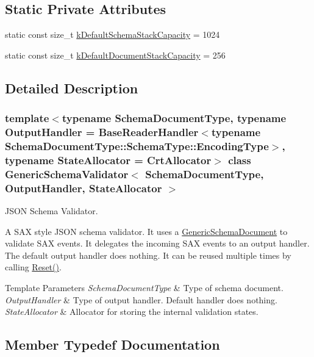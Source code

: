\subsection*{Static Private Attributes}
\begin{DoxyCompactItemize}
\item 
static const size\+\_\+t \hyperlink{classGenericSchemaValidator_aab8510602779c91bc5b55ea81fd7385b}{k\+Default\+Schema\+Stack\+Capacity} = 1024
\item 
static const size\+\_\+t \hyperlink{classGenericSchemaValidator_a0052a86778575179422064167a95c405}{k\+Default\+Document\+Stack\+Capacity} = 256
\end{DoxyCompactItemize}


\subsection{Detailed Description}
\subsubsection*{template$<$typename Schema\+Document\+Type, typename Output\+Handler = Base\+Reader\+Handler$<$typename Schema\+Document\+Type\+::\+Schema\+Type\+::\+Encoding\+Type$>$, typename State\+Allocator = Crt\+Allocator$>$\newline
class Generic\+Schema\+Validator$<$ Schema\+Document\+Type, Output\+Handler, State\+Allocator $>$}

J\+S\+ON Schema Validator. 

A S\+AX style J\+S\+ON schema validator. It uses a {\ttfamily \hyperlink{classGenericSchemaDocument}{Generic\+Schema\+Document}} to validate S\+AX events. It delegates the incoming S\+AX events to an output handler. The default output handler does nothing. It can be reused multiple times by calling {\ttfamily \hyperlink{classGenericSchemaValidator_a49efbbe098cb77728be3d48cafed17e4}{Reset()}}.


\begin{DoxyTemplParams}{Template Parameters}
{\em Schema\+Document\+Type} & Type of schema document. \\
\hline
{\em Output\+Handler} & Type of output handler. Default handler does nothing. \\
\hline
{\em State\+Allocator} & Allocator for storing the internal validation states. \\
\hline
\end{DoxyTemplParams}


\subsection{Member Typedef Documentation}
\mbox{\label{classGenericSchemaValidator_a8b7dab5a0cda9cc0adaefb4401d260c1}} 
